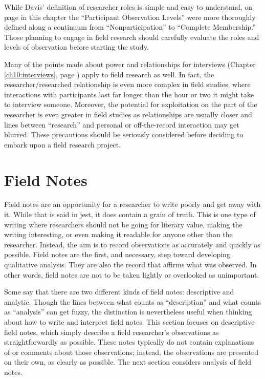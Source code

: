 While Davis' definition of researcher roles is simple and easy to understand, on page \pageref{11:continuum} in this chapter the ``Participant Observation Levels'' were more thoroughly defined along a continuum from ``Nonparticipation'' to ``Complete Membership.'' Those planning to engage in field research should carefully evaluate the roles and levels of observation before starting the study.

Many of the points made about power and relationships for interviews (Chapter \ref{ch10:interviews}, page \pageref{ch10:interviews}) apply to field research as well. In fact, the researcher/researched relationship is even more complex in field studies, where interactions with participants last far longer than the hour or two it might take to interview someone. Moreover, the potential for exploitation on the part of the researcher is even greater in field studies as relationships are usually closer and lines between ``research'' and personal or off-the-record interaction may get blurred. These precautions should be seriously considered before deciding to embark upon a field research project.

\section{Field Notes}

Field notes are an opportunity for a researcher to write poorly and get away with it. While that is said in jest, it does contain a grain of truth. This is one type of writing where researchers should not be going for literary value, making the writing interesting, or even making it readable for anyone other than the researcher. Instead, the aim is to record observations as accurately and quickly as possible. Field notes are the first, and necessary, step toward developing qualitative analysis. They are also the record that affirms what was observed. In other words, field notes are not to be taken lightly or overlooked as unimportant.

Some say that there are two different kinds of field notes: descriptive and analytic. Though the lines between what counts as ``description'' and what counts as ``analysis'' can get fuzzy, the distinction is nevertheless useful when thinking about how to write and interpret field notes. This section focuses on descriptive field notes, which simply describe a field researcher's observations as straightforwardly as possible. These notes typically do not contain explanations of or comments about those observations; instead, the observations are presented on their own, as clearly as possible. The next section considers analysis of field notes.

